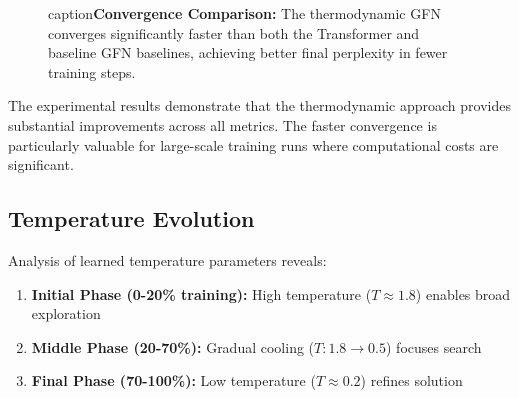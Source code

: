 \documentclass[12pt,a4paper]{article}
\begin{document}
\begin{figure}[htbp]
\centering
{}
caption{\textbf{Convergence Comparison:} The thermodynamic GFN converges 
         significantly faster than both the Transformer and baseline GFN 
         baselines, achieving better final perplexity in fewer training 
         steps.}
\label{fig:convergence}
\end{figure}

The experimental results demonstrate that the thermodynamic approach provides substantial improvements across all metrics. The faster convergence is particularly valuable for large-scale training runs where computational costs are significant.

\subsection{Temperature Evolution}

Analysis of learned temperature parameters reveals:

\begin{enumerate}[label=\textbf{\arabic*.}, leftmargin=1.5cm]
\item \textbf{Initial Phase (0-20\% training):} High temperature ($T \approx 1.8$) enables broad exploration
\item \textbf{Middle Phase (20-70\%):} Gradual cooling ($T: 1.8 \to 0.5$) focuses search
\item \textbf{Final Phase (70-100\%):} Low temperature ($T \approx 0.2$) refines solution
\end{enumerate}
\end{document}
